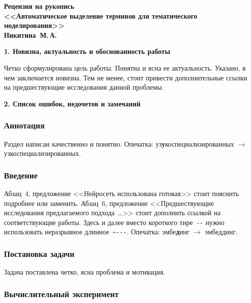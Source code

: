 \documentclass[12pt, a4paper]{extarticle}
\begin{document}

\begin{center}
    \textsf{\textbf{
        Рецензия на рукопись\\
        <<Автоматическое выделение терминов для тематического моделирования>>\\
        Никитина~М.\,А.
    }}
\end{center}

\begin{center}
    \textbf{1. Новизна, актуальность и обоснованность работы}
\end{center}

Четко сформулирована цель работы. Понятна и ясна ее актуальность.
Указано, в чем заключается новизна. Тем не менее, стоит привести дополнительные ссылки
на предшествующие исследования данной проблемы.

\begin{center}
    \textbf{2. Список ошибок, недочетов и замечаний}
\end{center}

\subsubsection*{Аннотация}

Раздел написан качественно и понятно. 
Опечатка: уз\textbf{у}коспециализированных $\to$ узкоспециализированных.

\subsubsection*{Введение}

Абзац~4, предложение <<Нейросеть использована готовая>> стоит пояснить подробнее или заменить.
Абзац~6, предложение <<Предшествующие исследования предлагаемого подхода~\ldots>> стоит
дополнить ссылкой на соответствующие работы.
Здесь и далее вместо короткого тире~\verb|--| нужно использовать неразрывное длинное~\verb|~---|.
Опечатка: эмбе\textbf{д}инг $\to$ эмбеддинг.

\subsubsection*{Постановка задачи}

Задача поставлена четко, ясна проблема и мотивация.

\subsubsection*{Вычислительный эксперимент}
\end{document}
